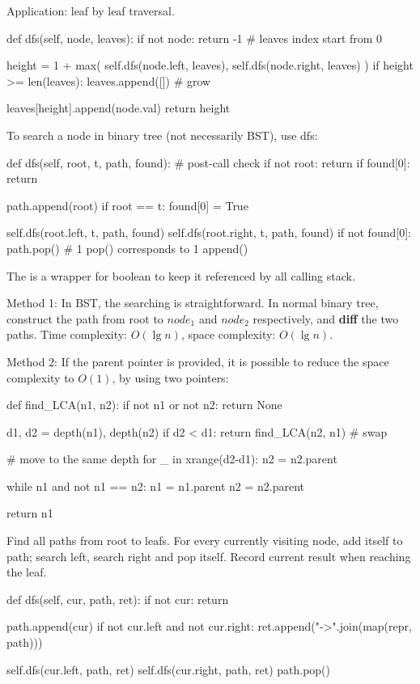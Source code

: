 Application: leaf by leaf traversal. 
\begin{python}
def dfs(self, node, leaves):
    if not node:
        return -1  # leaves index start from 0

    height = 1 + max(
        self.dfs(node.left, leaves), 
        self.dfs(node.right, leaves)
    )
    if height >= len(leaves):
        leaves.append([])  # grow

    leaves[height].append(node.val)
    return height
\end{python}
 To search a node in binary tree (not necessarily BST), use dfs:
\begin{python}
def dfs(self, root, t, path, found):
    # post-call check
    if not root: return        
    if found[0]: return 

    path.append(root)
    if root == t:
        found[0] = True

    self.dfs(root.left, t, path, found)
    self.dfs(root.right, t, path, found)
    if not found[0]:
        path.pop()  # 1 pop() corresponds to 1 append()
\end{python}
The  is a wrapper for boolean to keep it referenced by all calling stack. 

 Method 1: In BST, the searching is straightforward. In normal binary tree, construct the path from root to $node_1$ and $node_2$ respectively, and \textbf{diff} the two paths. Time complexity: $O(\lg n)$, space complexity: $O(\lg n)$. 

Method 2: If the parent pointer is provided, it is possible to reduce the space complexity to $O(1)$, by using two pointers: 
\begin{python}
def find_LCA(n1, n2):
    if not n1 or not n2:
        return None 
        
    d1, d2 = depth(n1), depth(n2)
    if d2 < d1:
        return find_LCA(n2, n1)  # swap
        
    # move to the same depth 
    for _ in xrange(d2-d1):
        n2 = n2.parent  

    while n1 and not n1 == n2:  
        n1 = n1.parent
        n2 = n2.parent
        
    return n1
\end{python}

 Find all paths from root to leafs. For every currently visiting node, add itself to path; search left, search right and pop itself. Record current result when reaching the leaf.
\begin{python}
def dfs(self, cur, path, ret):
    if not cur: return

    path.append(cur)
    if not cur.left and not cur.right:
        ret.append("->".join(map(repr, path)))

    self.dfs(cur.left, path, ret)
    self.dfs(cur.right, path, ret)
    path.pop()
\end{python}

